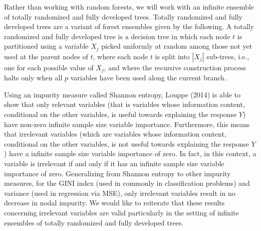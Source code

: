 \documentclass[12pt,twoside]{reedthesis}
\theoremstyle{definition}
\theoremstyle{definition}
\theoremstyle{definition}
\theoremstyle{remark}
\begin{document}
Rather than working with random forests, we will work with an infinite
ensemble of totally randomized and fully developed trees. Totally
randomized and fully developed trees are a variant of forest ensembles
given by the following. A totally randomized and fully developed tree is
a decision tree in which each node \(t\) is partitioned using a variable
\(X_j\) picked uniformly at random among those not yet used at the
parent nodes of \(t\), where each node \(t\) is split into \(|X_j|\)
sub-trees, i.e., one for each possible value of \(X_j\), and where the
recursive construction process halts only when all \(p\) variables have
been used along the current branch. \par

Using an impurity measure called Shannon entropy, Louppe (2014) is able
to show that only relevant variables (that is variables whose
information content, conditional on the other variables, is useful
towards explaining the response \(Y\)) have non-zero infinite sample
size variable importance. Furthermore, this means that irrelevant
variables (which are variables whose information content, conditional on
the other variables, is not useful towards explaining the response
\(Y\)) have a infinite sample size variable importance of zero. In fact,
in this context, a variable is irrelevant if and only if it has an
infinite sample size variable importance of zero. Generalizing from
Shannon entropy to other impurity measures, for the GINI index (used in
commonly in classification problems) and variance (used in regression
via MSE), only irrelevant variables result in no decrease in nodal
impurity. We would like to reiterate that these results concerning
irrelevant variables are valid particularly in the setting of infinite
ensembles of totally randomized and fully developed trees. \par
\end{document}
